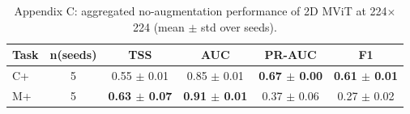 \begin{table}[p]
\centering
\footnotesize
\caption{Appendix C: aggregated no-augmentation performance of 2D MViT at 224$\times$224 (mean $\pm$ std over seeds).}
\label{tab:appC_mvit_noaug_agg}
\begin{tabular}{lccccc}
\toprule
Task & n(seeds) & TSS & AUC & PR-AUC & F1 \\
\midrule
C+ & 5 & 0.55 $\pm$ 0.01 & 0.85 $\pm$ 0.01 & \textbf{0.67 $\pm$ 0.00} & \textbf{0.61 $\pm$ 0.01} \\
M+ & 5 & \textbf{0.63 $\pm$ 0.07} & \textbf{0.91 $\pm$ 0.01} & 0.37 $\pm$ 0.06 & 0.27 $\pm$ 0.02 \\
\bottomrule
\end{tabular}
\end{table}
